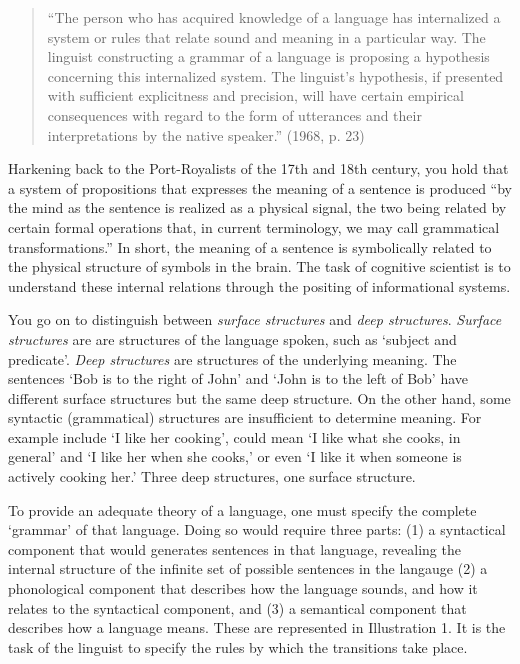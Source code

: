 \begin{refsection}
\begin{quote}
``The person who has acquired knowledge of a language has internalized a system or rules that relate sound and meaning in a particular way. The linguist constructing a grammar of a language is proposing a hypothesis concerning this internalized system. The linguist's hypothesis, if presented with sufficient explicitness and precision, will have certain empirical consequences with regard to the form of utterances and their interpretations by the native speaker.'' (1968, p. 23)
\end{quote}

Harkening back to the Port-Royalists of the 17th and 18th century, you hold that a system of propositions that expresses the meaning of a sentence is produced ``by the mind as the sentence is realized as a physical signal, the two being related by certain formal operations that, in current terminology, we may call grammatical transformations.'' In short, the meaning of a sentence is symbolically related to the physical structure of symbols in the brain. The task of cognitive scientist is to understand these internal relations through the positing of informational systems.

You go on to distinguish between \emph{surface structures} and \emph{deep structures}. \emph{Surface structures} are are structures of the language spoken, such as `subject and predicate'. \emph{Deep structures} are structures of the underlying meaning. The sentences `Bob is to the right of John' and `John is to the left of Bob' have different surface structures but the same deep structure. On the other hand, some syntactic (grammatical) structures are insufficient to determine meaning. For example include `I like her cooking', could mean `I like what she cooks, in general' and `I like her when she cooks,' or even `I like it when someone is actively cooking her.' Three deep structures, one surface structure.

To provide an adequate theory of a language, one must specify the complete `grammar' of that language. Doing so would require three parts: (1) a syntactical component that would generates sentences in that language, revealing the internal structure of the infinite set of possible sentences in the langauge (2) a phonological component that describes how the language sounds, and how it relates to the syntactical component, and (3) a semantical component that describes how a language means. These are represented in Illustration 1. It is the task of the linguist to specify the rules by which the transitions take place.


\end{refsection}
